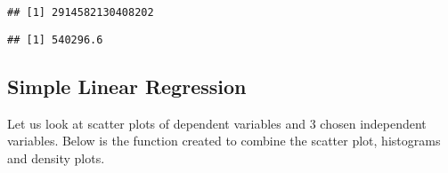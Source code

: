 \documentclass[]{article}
\newenvironment{Shaded}{\begin{snugshade}}{\end{snugshade}}
\newcommand{\CommentTok}[1]{\textcolor[rgb]{0.56,0.35,0.01}{\textit{#1}}}
\newcommand{\DataTypeTok}[1]{\textcolor[rgb]{0.13,0.29,0.53}{#1}}
\newcommand{\KeywordTok}[1]{\textcolor[rgb]{0.13,0.29,0.53}{\textbf{#1}}}
\newcommand{\NormalTok}[1]{#1}
\newcommand{\OperatorTok}[1]{\textcolor[rgb]{0.81,0.36,0.00}{\textbf{#1}}}
\begin{document}
\begin{verbatim}
## [1] 2914582130408202
\end{verbatim}

\begin{Shaded}
\end{Shaded}

\begin{verbatim}
## [1] 540296.6
\end{verbatim}

\hypertarget{simple-linear-regression}{%
\subsection{Simple Linear Regression}\label{simple-linear-regression}}

Let us look at scatter plots of dependent variables and 3 chosen
independent variables. Below is the function created to combine the
scatter plot, histograms and density plots.
\end{document}
